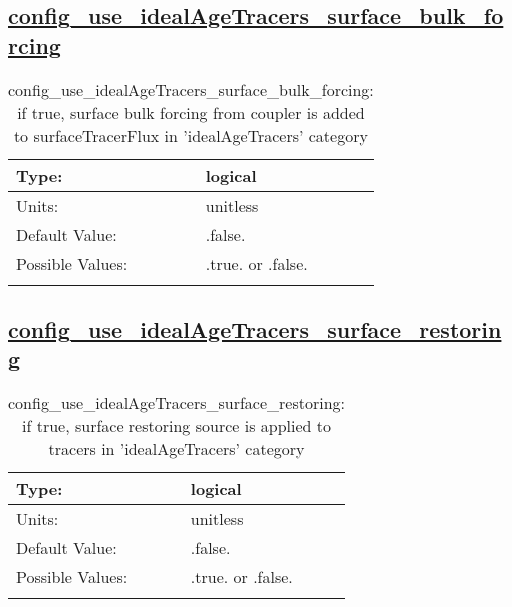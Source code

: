 \subsection[config\_use\_idealAgeTracers\_surface\_bulk\_forcing]{\hyperref[sec:nm_tab_tracer_forcing_idealAgeTracers]{config\_use\_idealAgeTracers\_surface\_bulk\_forcing}}
\label{subsec:nm_sec_config_use_idealAgeTracers_surface_bulk_forcing}
\begin{center}
\begin{longtable}{| p{2.0in} || p{4.0in} |}
    \hline
    Type: & logical \\
    \hline
    Units: & \si{unitless} \\
    \hline
    Default Value: & .false. \\
    \hline
    Possible Values: & .true. or .false. \\
    \hline
    \caption{config\_use\_idealAgeTracers\_surface\_bulk\_forcing: if true, surface bulk forcing from coupler is added to surfaceTracerFlux in 'idealAgeTracers' category}
\end{longtable}
\end{center}
\subsection[config\_use\_idealAgeTracers\_surface\_restoring]{\hyperref[sec:nm_tab_tracer_forcing_idealAgeTracers]{config\_use\_idealAgeTracers\_surface\_restoring}}
\label{subsec:nm_sec_config_use_idealAgeTracers_surface_restoring}
\begin{center}
\begin{longtable}{| p{2.0in} || p{4.0in} |}
    \hline
    Type: & logical \\
    \hline
    Units: & \si{unitless} \\
    \hline
    Default Value: & .false. \\
    \hline
    Possible Values: & .true. or .false. \\
    \hline
    \caption{config\_use\_idealAgeTracers\_surface\_restoring: if true, surface restoring source is applied to tracers in 'idealAgeTracers' category}
\end{longtable}
\end{center}
